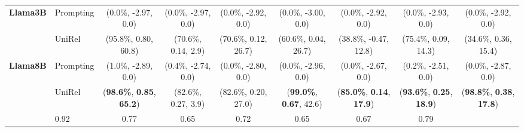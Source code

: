 \begin{table}[t]
{\begin{tabular}{llccccccc}
\midrule
\multirow{2}{*}{\textbf{Llama3B}}         
& Prompting    & (0.0\%, -2.97, 0.0)  & (0.0\%, -2.97, 0.0)  & (0.0\%, -2.92, 0.0)  & (0.0\%, -3.00, 0.0)  & (0.0\%, -2.92, 0.0)  & (0.0\%, -2.93, 0.0)  & (0.0\%, -2.92, 0.0)  \\
& UniRel  & (95.8\%, 0.80, 60.8)  & (70.6\%, 0.14, 2.9)  & (70.6\%, 0.12, 26.7)  & (60.6\%, 0.04, 26.7)  & (38.8\%, -0.47, 12.8) & (75.4\%, 0.09, 14.3)  & (34.6\%, 0.36, 15.4)  \\ 
\multirow{2}{*}{\textbf{Llama8B}}         
& Prompting    & (1.0\%, -2.89, 0.0)  & (0.4\%, -2.74, 0.0)  & (0.0\%, -2.80, 0.0)  & (0.0\%, -2.96, 0.0)  & (0.0\%, -2.67, 0.0)  & (0.2\%, -2.51, 0.0)  & (0.0\%, -2.87, 0.0)  \\
& UniRel  & ({\color{orange}\textbf{98.6\%}}, {\color{orange}\textbf{0.85}}, {\color{orange}\textbf{65.2}})  & (82.6\%, 0.27, 3.9)  & (82.6\%, 0.20, 27.0)  & ({\color{orange}\textbf{99.0\%}}, {\color{orange}\textbf{0.67}}, 42.6)  & ({\color{orange}\textbf{85.0\%}}, {\color{orange}\textbf{0.14}}, {\color{orange}\textbf{17.9}}) & ({\color{orange}\textbf{93.6\%}}, {\color{orange}\textbf{0.25}}, {\color{orange}\textbf{18.9}})  & ({\color{orange}\textbf{98.8\%}}, {\color{orange}\textbf{0.38}}, {\color{orange}\textbf{17.8}})  \\
\midrule
\rowcolor{blue!10}
\multicolumn{2}{l}{\textbf{Optimal Reward}} & 0.92   & 0.77   & 0.65   & 0.72   & 0.65   & 0.67 & 0.79 \\
\bottomrule
\end{tabular}
}
\label{tab:main_results}
\end{table}



